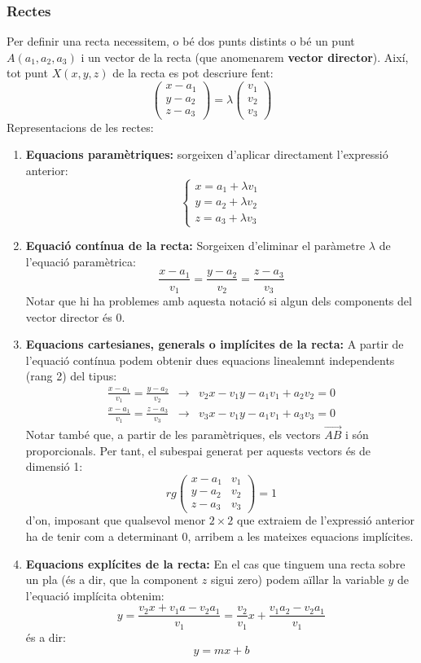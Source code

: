 \documentclass{beamer}
\begin{document}
\begin{frame}[allowframebreaks]
  \frametitle{Rectes}
    Per definir una recta necessitem, o bé dos punts distints o bé un punt $A(a_1,a_2,a_3)$ i un vector  de la recta (que anomenarem {\bf vector director}). Així, tot punt $X(x,y,z)$ de la recta es pot descriure fent:
    \[
    \begin{pmatrix}x-a_1\\y-a_2\\z-a_3\end{pmatrix}=\lambda
      \begin{pmatrix}v_1\\v_2\\v_3\end{pmatrix}
    \]
    Representacions de les rectes:
    \begin{enumerate}
      \item {\bf Equacions paramètriques:} sorgeixen d'aplicar directament l'expressió anterior:
      \[
      \begin{cases}
        x=a_1+\lambda v_1\\
        y=a_2+\lambda v_2\\
        z=a_3+\lambda v_3
      \end{cases}
      \]
      \item {\bf Equació contínua de la recta:} Sorgeixen d'eliminar el paràmetre $\lambda$ de l'equació paramètrica:
      \[
        \frac{x-a_1}{v_1}=\frac{y-a_2}{v_2}=\frac{z-a_3}{v_3}
      \]
      Notar que hi ha problemes amb aquesta notació si algun dels components del vector director és 0.
      \item {\bf Equacions cartesianes, generals o implícites de la recta:} A partir de l'equació contínua podem obtenir dues equacions linealemnt independents (rang 2) del tipus:
      \begin{eqnarray*}
        \frac{x-a_1}{v_1}=\frac{y-a_2}{v_2}&\rightarrow&v_2x-v_1y-a_1v_1+a_2v_2=0\\
        \frac{x-a_1}{v_1}=\frac{z-a_3}{v_3}&\rightarrow&v_3x-v_1y-a_1v_1+a_3v_3=0
      \end{eqnarray*}
      Notar també que, a partir de les paramètriques, els vectors $\overrightarrow{AB}$ i  són proporcionals. Per tant, el subespai generat per aquests vectors és de dimensió 1:
      \[
      rg \begin{pmatrix}x-a_1&v_1\\y-a_2&v_2\\z-a_3&v_3\end{pmatrix}=1
      \]
      d'on, imposant que qualsevol menor $2\times 2$ que extraiem de l'expressió anterior ha de tenir com a determinant 0, arribem a les mateixes equacions implícites.
      \item {\bf Equacions explícites de la recta:} En el cas que tinguem una recta sobre un pla (és a dir, que la component $z$ sigui zero) podem aïllar la variable $y$ de l'equació implícita obtenim:
      \[
      y=\frac{v_2x+v_1a-v_2a_1}{v_1}=\frac{v_2}{v_1}x+\frac{v_1a_2-v_2a_1}{v_1}
      \]
      és a dir:
      \[
      y=mx+b
      \]
    \end{enumerate}
\end{frame}
\end{document}
